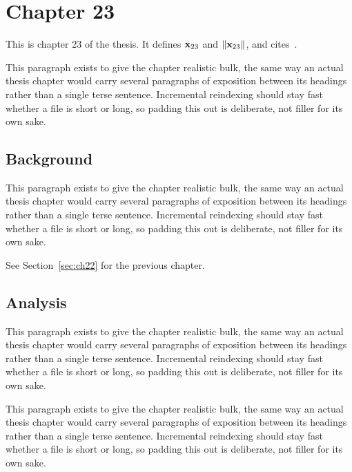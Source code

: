 \section{Chapter 23}
\label{sec:ch23}

This is chapter 23 of the thesis. It defines $\mathbf{x}_{23}$ and $\lVert \mathbf{x}_{23} \rVert$, and cites~\cite{ref1}.

This paragraph exists to give the chapter realistic bulk, the same way an actual thesis chapter would carry several paragraphs of exposition between its headings rather than a single terse sentence. Incremental reindexing should stay fast whether a file is short or long, so padding this out is deliberate, not filler for its own sake.

\subsection{Background}
\label{sec:ch23:background}

This paragraph exists to give the chapter realistic bulk, the same way an actual thesis chapter would carry several paragraphs of exposition between its headings rather than a single terse sentence. Incremental reindexing should stay fast whether a file is short or long, so padding this out is deliberate, not filler for its own sake.

See Section~\ref{sec:ch22} for the previous chapter.

\subsection{Analysis}
\label{sec:ch23:analysis}

This paragraph exists to give the chapter realistic bulk, the same way an actual thesis chapter would carry several paragraphs of exposition between its headings rather than a single terse sentence. Incremental reindexing should stay fast whether a file is short or long, so padding this out is deliberate, not filler for its own sake.

This paragraph exists to give the chapter realistic bulk, the same way an actual thesis chapter would carry several paragraphs of exposition between its headings rather than a single terse sentence. Incremental reindexing should stay fast whether a file is short or long, so padding this out is deliberate, not filler for its own sake.
